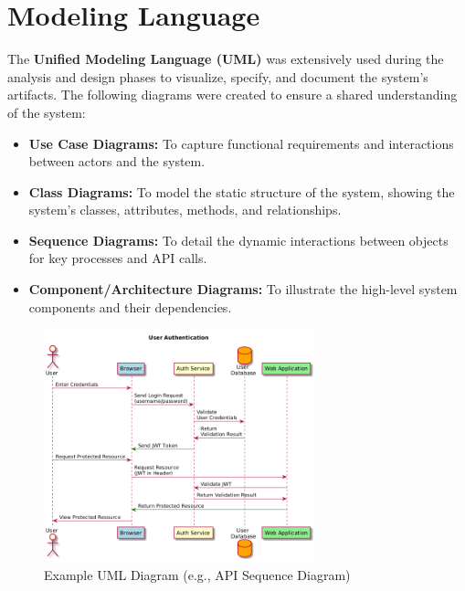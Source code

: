 \section{Modeling Language}
The \textbf{Unified Modeling Language (UML)} was extensively used during the analysis and design phases to visualize, specify, and document the system's artifacts. The following diagrams were created to ensure a shared understanding of the system:
\begin{itemize}
    \item \textbf{Use Case Diagrams:} To capture functional requirements and interactions between actors and the system.
    \item \textbf{Class Diagrams:} To model the static structure of the system, showing the system's classes, attributes, methods, and relationships.
    \item \textbf{Sequence Diagrams:} To detail the dynamic interactions between objects for key processes and API calls.
    \item \textbf{Component/Architecture Diagrams:} To illustrate the high-level system components and their dependencies.
\end{itemize}
\begin{figure}[H]
    \centering
    \includegraphics[width=0.7\textwidth]{chapters/chapter 1/figures/Sequence-Example2-1.png}
    \caption{Example UML Diagram (e.g., API Sequence Diagram)}
    \label{fig:uml}
\end{figure}


